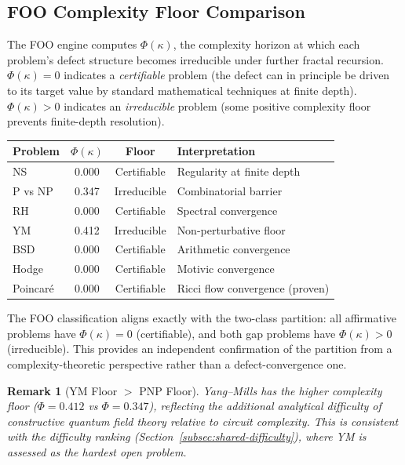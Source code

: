 \documentclass[11pt]{article}
\newtheorem{remark}[theorem]{Remark}
\begin{document}
\subsection{FOO Complexity Floor Comparison}
\label{subsec:foo-compare}

The FOO engine computes $\Phi(\kappa)$, the complexity horizon at
which each problem's defect structure becomes irreducible under
further fractal recursion.  $\Phi(\kappa) = 0$ indicates a
\emph{certifiable} problem (the defect can in principle be driven to
its target value by standard mathematical techniques at finite depth).
$\Phi(\kappa) > 0$ indicates an \emph{irreducible} problem (some
positive complexity floor prevents finite-depth resolution).

\begin{center}
\begin{tabular}{@{}lccl@{}}
\toprule
\textbf{Problem} & $\Phi(\kappa)$ & \textbf{Floor} & \textbf{Interpretation} \\
\midrule
NS          & 0.000 & Certifiable & Regularity at finite depth \\
P vs NP     & 0.347 & Irreducible & Combinatorial barrier \\
RH          & 0.000 & Certifiable & Spectral convergence \\
YM          & 0.412 & Irreducible & Non-perturbative floor \\
BSD         & 0.000 & Certifiable & Arithmetic convergence \\
Hodge       & 0.000 & Certifiable & Motivic convergence \\
Poincar\'e  & 0.000 & Certifiable & Ricci flow convergence (proven) \\
\bottomrule
\end{tabular}
\end{center}

\noindent
The FOO classification aligns exactly with the two-class partition:
all affirmative problems have $\Phi(\kappa) = 0$ (certifiable), and
both gap problems have $\Phi(\kappa) > 0$ (irreducible).  This
provides an independent confirmation of the partition from a
complexity-theoretic perspective rather than a defect-convergence one.

\begin{remark}[YM Floor $>$ PNP Floor]
Yang--Mills has the higher complexity floor ($\Phi = 0.412$ vs
$\Phi = 0.347$), reflecting the additional analytical difficulty of
constructive quantum field theory relative to circuit complexity.
This is consistent with the difficulty ranking
(Section~\ref{subsec:shared-difficulty}), where YM is assessed as the hardest
open problem.
\end{remark}
\end{document}
